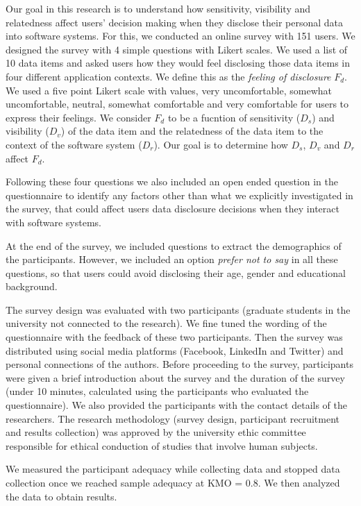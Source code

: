 \documentclass[conference]{IEEEtran}
\begin{document}
Our goal in this research is to understand how sensitivity, visibility and relatedness affect users' decision making when they disclose their personal data into software systems. For this, we conducted an online survey with 151 users. We designed the survey with 4 simple questions with Likert scales. We used a list of 10 data items and asked users how they would feel disclosing those data items in four different application contexts. We define this as the \textit{feeling of disclosure} $F_d$. We used a five point Likert scale with values, very uncomfortable, somewhat uncomfortable, neutral, somewhat comfortable and very comfortable for users to express their feelings. We consider $F_d$ to be a fucntion of sensitivity ($D_s$) and visibility ($D_v$) of the data item and the relatedness of the data item to the context of the software system ($D_r$). Our goal is to determine how $D_s$, $D_v$ and $D_r$ affect $F_d$.

Following these four questions we also included an open ended question in the questionnaire to identify any factors other than what we explicitly investigated in the survey, that could affect users data disclosure decisions when they interact with software systems. 

At the end of the survey, we included questions to extract the demographics of the participants. However, we included an option \textit{prefer not to say} in all these questions, so that users could avoid disclosing their age, gender and educational background.

The survey design was evaluated with two participants (graduate students in the university not connected to the research). We fine tuned the wording of the questionnaire with the feedback of these two participants. Then the survey was distributed using social media platforms (Facebook, LinkedIn and Twitter) and personal connections of the authors. Before proceeding to the survey, participants were given a brief introduction about the survey and the duration of the survey (under 10 minutes, calculated using the participants who evaluated the questionnaire). We also provided the participants with the contact details of the researchers. The research methodology (survey design, participant recruitment and results collection) was approved by the university ethic committee responsible for ethical conduction of studies that involve human subjects.

We measured the participant adequacy while collecting data and stopped data collection once we reached sample adequacy at KMO = 0.8. We then analyzed the data to obtain results.
\end{document}
